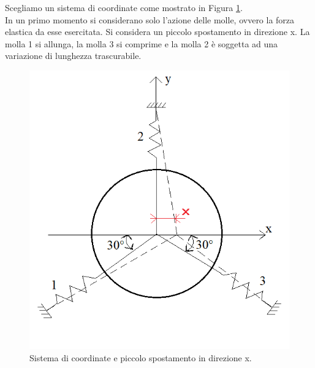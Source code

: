 Scegliamo un sistema di coordinate come mostrato in Figura \ref{SistemaCoordinate}.
\\
In un primo momento si considerano solo l'azione delle molle, ovvero la forza elastica da esse esercitata. 
Si considera un piccolo spostamento in direzione x. La molla 1 si allunga, la molla 3 si comprime e la molla 2 è soggetta ad una variazione di lunghezza trascurabile. 
\begin{figure}[h]
    \centering
    \includegraphics[scale=0.6]{Lavatrice3Molle.png}
    \caption{Sistema di coordinate e piccolo spostamento in direzione x.}
    \label{SistemaCoordinate}
\end{figure}


